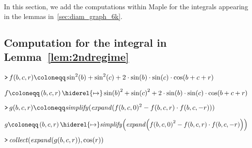 \documentclass{article}
\theoremstyle{definition}
\newcounter{col}
\begin{document}
In this section, we add the computations within Maple for the integrals appearing in the lemmas in~\cref{sec:diam_graph_6k}.

\subsection{Computation for the integral in Lemma~\ref{lem:2ndregime}}\label{subsec:integral_v1}

\mapleinput
{$ \displaystyle \texttt{>\,} f (b ,c ,r)\coloneqq \sin^{2}(b)+\sin^{2}(c)+2\cdot \sin (b)\cdot \sin (c)\cdot \cos (b +c +r)\, $}

\begin{dmath}\label{(1)}
f \coloneqq \left(b ,c ,r \right)\hiderel{\mapsto }\sin \! \left(b \right)^{2}+\sin \! \left(c \right)^{2}+2\cdot \sin \! \left(b \right)\cdot \sin \! \left(c \right)\cdot \cos \! \left(b +c +r \right)
\end{dmath}
\mapleinput
{$ \displaystyle \texttt{>\,} g (b ,c ,r)\coloneqq \mathit{simplify} (\mathit{expand} (f (b ,c ,0)^{2}-f (b ,c ,r)\cdot f (b ,c ,-r)))\, $}

\begin{dmath}\label{(2)}
g \coloneqq \left(b ,c ,r \right)\hiderel{\mapsto }\mathit{simplify} \! \left(\mathit{expand} \! \left(f \! \left(b ,c ,0\right)^{2}-f \! \left(b ,c ,r \right)\cdot f \! \left(b ,c ,-r \right)\right)\right)
\end{dmath}
\mapleinput
{$ \displaystyle \texttt{>\,} \mathit{collect} (\mathit{expand} (g (b ,c ,r)),\cos (r))\, $}
\end{document}
